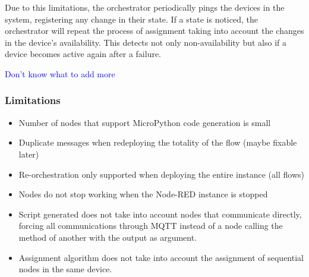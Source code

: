 Due to this limitations, the orchestrator periodically pings the devices in the system, registering any change in their state. If a state is noticed, the orchestrator will repeat the process of assignment taking into account the changes in the device's availability. This detects not only non-availability but also if a device becomes active again after a failure.

\textcolor{blue}{Don't know what to add more}

\subsubsection{Limitations}\label{sec:limitations}

\begin{itemize}
    \item Number of nodes that support MicroPython code generation is small
    \item Duplicate messages when redeploying the totality of the flow (maybe fixable later)
    \item Re-orchestration only supported when deploying the entire instance (all flows)
    \item Nodes do not stop working when the Node-RED instance is stopped
    \item Script generated does not take into account nodes that communicate directly, forcing all communications through MQTT instead of a node calling the method of another with the output as argument.
    \item Assignment algorithm does not take into account the assignment of sequential nodes in the same device.
\end{itemize}
